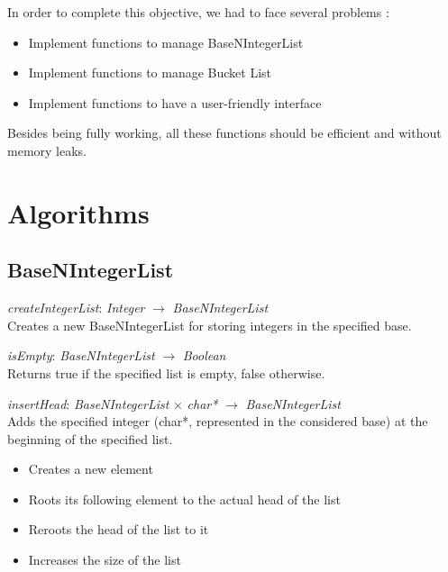 \documentclass[book, backcover, english, nodocumentinfo]{upmethodology-document}
\begin{document}
In order to complete this objective, we had to face several problems :
\begin{itemize}
	\item{} Implement functions to manage BaseNIntegerList
	\item{} Implement functions to manage Bucket List
	\item{} Implement functions to have a user-friendly interface
\end{itemize}

Besides being fully working, all these functions should be efficient and without memory leaks.

\chapter{Algorithms} \label{chapter:Algorithms}
	\section{BaseNIntegerList}

		\begin{minipage}{\linewidth}
			\textit{createIntegerList}: \textit{Integer} $\rightarrow$ \textit{BaseNIntegerList}\\
			Creates a new BaseNIntegerList for storing integers in the specified base.
			\label{algo:BNIL-CreateIntegerList}
			
		\end{minipage}
		\nxtalgo{}

		\begin{minipage}{\linewidth}
			\textit{isEmpty}: \textit{BaseNIntegerList} $\rightarrow$ \textit{Boolean}\\
			Returns true if the specified list is empty, false otherwise.
			\label{algo:BNIL-IsEmpty}
			
		\end{minipage}
		\nxtalgo{}

		\begin{minipage}{\linewidth}
			\textit{insertHead}: \textit{BaseNIntegerList} $\times$ \textit{char*} $\rightarrow$ \textit{BaseNIntegerList}\\
			Adds the specified integer (char*, represented in the considered base) at the beginning of the specified list.\\
			\ov
			\begin{itemize}
				\item Creates a new element
				\item Roots its following element to the actual head of the list
				\item Reroots the head of the list to it
				\item Increases the size of the list
			\end{itemize}
			\label{algo:BNIL-InsertHead}
			
		\end{minipage}
		\nxtalgo{}
\end{document}

